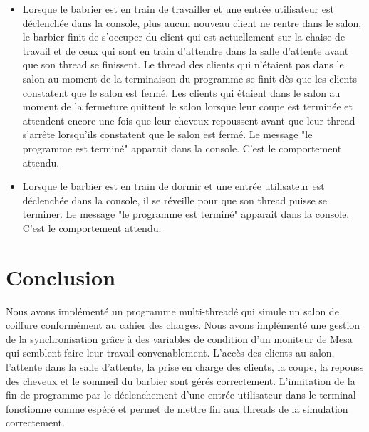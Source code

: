 \documentclass{article}
\begin{document}
\begin{itemize}
    \item Lorsque le babrier est en train de travailler et une entrée utilisateur est déclenchée dans la console, plus aucun nouveau client
    ne rentre dans le salon, le barbier finit de s'occuper du client qui est actuellement sur la chaise de travail et de ceux qui sont
    en train d'attendre dans la salle d'attente avant que son thread se finissent. Le thread des clients qui n'étaient pas dans le salon au 
    moment de la terminaison du programme se finit dès que les clients constatent que le salon est fermé. Les clients qui étaient dans le
    salon au moment de la fermeture quittent le salon lorsque leur coupe est terminée et attendent encore une fois que leur cheveux repoussent
    avant que leur thread s'arrête lorsqu'ils constatent que le salon est fermé. Le message "le programme est terminé" apparait dans la console.
    C'est le comportement attendu.
    \item Lorsque le barbier est en train de dormir et une entrée utilisateur est déclenchée dans la console, il se réveille pour que son
    thread puisse se terminer. Le message "le programme est terminé" apparait dans la console. C'est le comportement attendu.
\end{itemize}

\section*{Conclusion}

Nous avons implémenté un programme multi-threadé qui simule un salon de coiffure conformément au cahier des charges. Nous avons implémenté une
gestion de la synchronisation grâce à des variables de condition d'un moniteur de Mesa qui semblent faire leur travail convenablement. 
L'accès des clients au salon, l'attente dans la salle d'attente, la prise en charge des clients, la coupe, la repouss des cheveux et le 
sommeil du barbier sont gérés correctement.
L'innitation de la fin de programme par le déclenchement d'une entrée utilisateur dans le terminal fonctionne comme espéré et permet de 
mettre fin aux threads de la simulation correctement.
\end{document}
